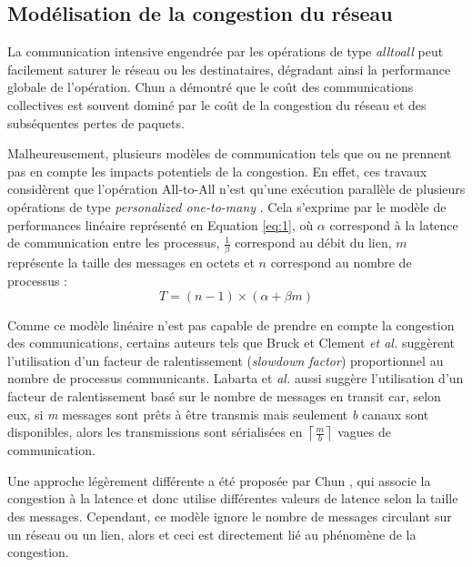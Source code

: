 \subsection{\label{cluster}Modélisation de la congestion du réseau}

La communication intensive engendrée par les opérations de type \textit{alltoall} peut facilement saturer le réseau ou les destinataires, dégradant ainsi la performance globale de l'opération. Chun \cite{Chun01} a démontré que le coût des communications collectives est souvent dominé par le coût de la congestion du réseau et des subséquentes pertes de paquets.

Malheureusement, plusieurs modèles de communication tels que \cite{Christara99} ou \cite{Pjesivac-Grbovic05} ne prennent pas en compte les impacts potentiels de la congestion. En effet, ces travaux considèrent que l'opération All-to-All n'est qu'une exécution parallèle de plusieurs opérations de type \emph{personalized one-to-many} \cite{Johnsson89}. Cela s'exprime par le modèle de performances linéaire représenté en Equation \ref{eq:1}, où $\alpha$ correspond à la latence de communication entre les processus, $\frac{1}{\beta}$ correspond au débit du lien, $m$ représente la taille des messages en octets et  $n$ correspond au nombre de processus :
\begin{equation}
T=(n-1)\times(\alpha+\beta m)\label{eq:1}
\end{equation}

Comme ce modèle linéaire n'est pas capable de prendre en compte la congestion des communications, certains auteurs tels que Bruck \cite{Bruck97b} et Clement \emph{et al.} \cite{Clement96} suggèrent l'utilisation d'un facteur de ralentissement (\emph{slowdown factor}) proportionnel au nombre de processus communicants.  Labarta et \emph{al.} \cite{Labarta96} aussi suggère l'utilisation d'un facteur de ralentissement basé sur le nombre de messages en transit car, selon eux, si \emph{m} messages sont prêts à être transmis mais seulement \emph{b} canaux sont disponibles, alors les transmissions sont sérialisées en $\left\lceil \frac{m}{b}\right\rceil $ vagues de communication. 

Une approche légèrement différente a été proposée par Chun \cite{Chun01}, qui associe la congestion à la latence et donc utilise différentes valeurs de latence selon la taille des messages. Cependant, ce modèle ignore le nombre de messages circulant sur un réseau ou un lien, alors et ceci est directement lié au phénomène de la congestion. 

